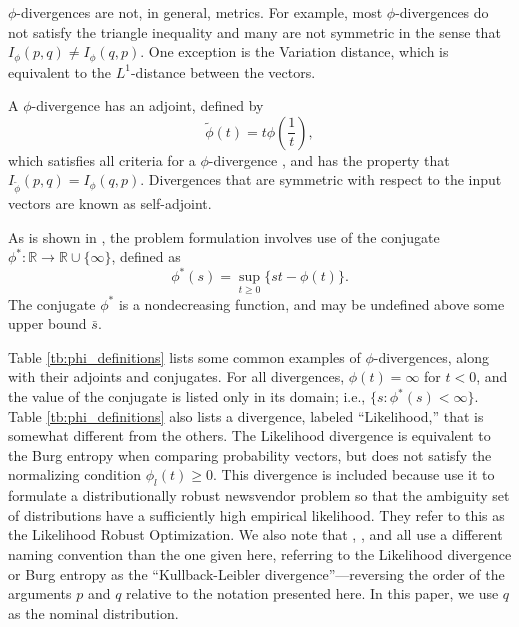 \documentclass[ijoc,letterpaper]{informs3} %
\newcommand{\R}{{\mathbb{R}}}
\begin{document}
$\phi$-divergences are not, in general, metrics.
For example, most $\phi$-divergences do not satisfy the triangle inequality and many are not symmetric in the sense that $I_\phi(p,q) \neq I_\phi(q,p)$.
One exception is the Variation distance, which is equivalent to the $L^1$-distance between the vectors.

A $\phi$-divergence has an adjoint, defined by
\begin{equation} \label{eq:adjoint}
	\tilde{\phi}(t) = t \phi\left(\frac{1}{t}\right),
\end{equation}
which satisfies all criteria for a $\phi$-divergence \citep{bental1991certainty}, and has the property that $I_{\tilde{\phi}}(p,q) = I_\phi(q,p)$.
Divergences that are symmetric with respect to the input vectors are known as self-adjoint.

As is shown in \citep{bental2011robust}, the problem formulation involves use of the conjugate $\phi^* : \R \rightarrow \R \cup \{\infty\}$, defined as
\begin{equation} \label{eq:conjugate}
	\phi^*(s) = \sup_{t \geq 0} \{st - \phi(t)\}.
\end{equation}
The conjugate $\phi^*$ is a nondecreasing function, and may be undefined above some upper bound $\bar{s}$.

Table \ref{tb:phi_definitions} lists some common examples of $\phi$-divergences, along with their adjoints and conjugates.
For all divergences, $\phi(t) = \infty$ for $t < 0$, and the value of the conjugate is listed only in its domain; i.e., $\{s : \phi^*(s) < \infty\}$.
Table \ref{tb:phi_definitions} also lists a divergence, labeled ``Likelihood,'' that is somewhat different from the others.
The Likelihood divergence is equivalent to the Burg entropy when comparing probability vectors, but does not satisfy the normalizing condition $\phi_l(t) \geq 0$.
This divergence is included because \cite{wang2010likelihood} use it to formulate a distributionally robust newsvendor problem so that the ambiguity set of distributions have a sufficiently high empirical likelihood. 
They refer to this as the Likelihood Robust Optimization. 
We also note that \cite{calafiore2007ambiguous}, \cite{hukullback}, and \cite{wang2010likelihood} all use a different naming convention than the one given here, referring to the Likelihood divergence or Burg entropy as the ``Kullback-Leibler divergence''---reversing the order of the arguments $p$ and $q$ relative to the notation presented here.
In this paper, we use $q$ as the nominal distribution. 
\end{document}
